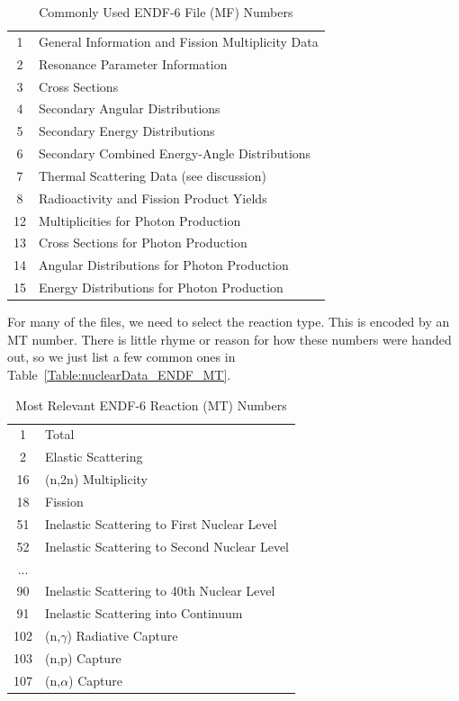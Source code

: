 \begin{table}[htp!]
\caption{Commonly Used ENDF-6 File (MF) Numbers}
\begin{center}
\begin{tabular}{|c|p{12cm}|} \hline
	1	& General Information and Fission Multiplicity Data \\
	2	& Resonance Parameter Information \\
	3	& Cross Sections \\
	4	& Secondary Angular Distributions \\
	5	& Secondary Energy Distributions \\
	6	& Secondary Combined Energy-Angle Distributions \\
	7	& Thermal Scattering Data (see discussion) \\
	8	& Radioactivity and Fission Product Yields \\
	12	& Multiplicities for Photon Production \\
	13	& Cross Sections for Photon Production \\
	14	& Angular Distributions for Photon Production \\
	15	& Energy Distributions for Photon Production \\ \hline
\end{tabular}
\end{center}
\label{Table:nuclearData_ENDF_MF}
\end{table}%

For many of the files, we need to select the reaction type. This is encoded by an MT number. There is little rhyme or reason for how these numbers were handed out, so we just list a few common ones in Table~\eqref{Table:nuclearData_ENDF_MT}.

\begin{table}[htp!]
\caption{Most Relevant ENDF-6 Reaction (MT) Numbers}
\begin{center}
\begin{tabular}{|c|p{12cm}|} \hline
	1	& Total \\
	2	& Elastic Scattering \\
	16	& (n,2n) Multiplicity \\
	18	& Fission \\
	51	& Inelastic Scattering to First Nuclear Level \\
	52	& Inelastic Scattering to Second Nuclear Level \\
	... & \\
	90	& Inelastic Scattering to 40th Nuclear Level \\
	91	& Inelastic Scattering into Continuum \\
	102	& (n,$\gamma$) Radiative Capture \\
	103 & (n,p) Capture \\
	107	& (n,$\alpha$) Capture \\ \hline
\end{tabular}
\end{center}
\label{Table:nuclearData_ENDF_MT}
\end{table}%

